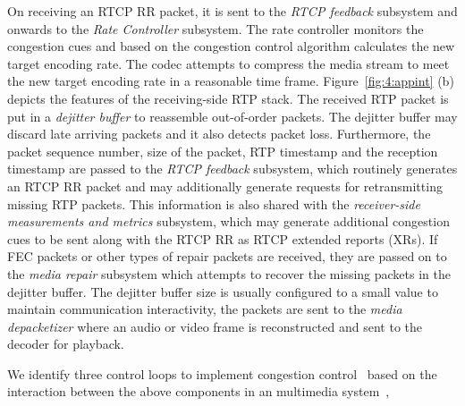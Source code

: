 On receiving an RTCP RR packet, it is sent to the \emph{RTCP feedback} subsystem and 
onwards to the \emph{Rate Controller} subsystem.
The rate controller monitors the congestion cues and based on the congestion control
algorithm calculates the  new target encoding rate. The codec attempts to
compress the media stream to meet the new target encoding rate in a reasonable
time frame. Figure~\ref{fig:4:appint} (b) depicts the features of the
receiving-side RTP stack. The received RTP packet is put in a \emph{dejitter buffer}
to reassemble out-of-order packets. The dejitter buffer may discard late
arriving packets and it also detects packet loss. Furthermore, the packet
sequence number, size of the packet, RTP timestamp and the reception
timestamp are passed to the \emph{RTCP feedback} subsystem, which routinely generates an
RTCP RR packet and may additionally generate requests for retransmitting
missing RTP packets. This information is also shared with the \emph{receiver-side
measurements and metrics} subsystem, which may generate additional congestion
cues to be sent along with the RTCP RR as RTCP extended reports (XRs). If FEC
packets or other types of repair packets are received, they are passed on to
the \emph{media repair} subsystem which attempts to recover the missing packets in
the dejitter buffer. The dejitter buffer size is usually configured to a small value to maintain
communication interactivity, the packets are sent to the \emph{media depacketizer} where
an audio or video frame is reconstructed and sent to the decoder for playback.


We identify three control loops to implement congestion
control~\cite{Singh:control.loops.api} based on the interaction between the
above components in an multimedia system~\cite{draft.rmcat.app.interaction},

